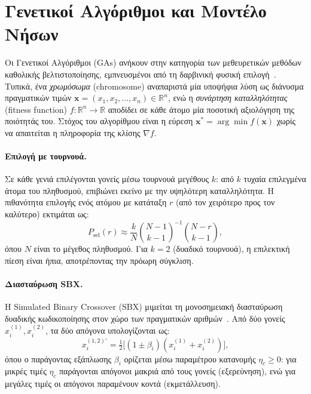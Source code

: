 \section{Γενετικοί Αλγόριθμοι και Μοντέλο Νήσων}
\label{sec:bg_ga_islands}

Οι Γενετικοί Αλγόριθμοι (GAs) ανήκουν στην κατηγορία των μεθευρετικών μεθόδων καθολικής βελτιστοποίησης, εμπνευσμένοι από τη δαρβινική φυσική επιλογή~\cite{goldberg1989genetic}. Τυπικά, ένα \textit{χρωμόσωμα} (chromosome) αναπαριστά μία υποψήφια λύση ως διάνυσμα πραγματικών τιμών $\bm{x} = (x_1, x_2, \ldots, x_n) \in \mathbb{R}^n$, ενώ η \textit{συνάρτηση καταλληλότητας} (fitness function) $f : \mathbb{R}^n \to \mathbb{R}$ αποδίδει σε κάθε άτομο μία ποσοτική αξιολόγηση της ποιότητάς του. Στόχος του αλγορίθμου είναι η εύρεση $\bm{x}^* = \arg\min f(\bm{x})$ χωρίς να απαιτείται η πληροφορία της κλίσης $\nabla f$.

\paragraph{Επιλογή με τουρνουά.}
Σε κάθε γενιά επιλέγονται γονείς μέσω τουρνουά μεγέθους $k$: από $k$ τυχαία επιλεγμένα άτομα του πληθυσμού, επιβιώνει εκείνο με την υψηλότερη καταλληλότητα. Η πιθανότητα επιλογής ενός ατόμου με κατάταξη $r$ (από τον χειρότερο προς τον καλύτερο) εκτιμάται ως:
\begin{equation}
    P_{\text{sel}}(r) \approx \frac{k}{N}\binom{N-1}{k-1}^{-1}\binom{N-r}{k-1},
\end{equation}
όπου $N$ είναι το μέγεθος πληθυσμού. Για $k=2$ (δυαδικό τουρνουά), η επιλεκτική πίεση είναι ήπια, αποτρέποντας την πρόωρη σύγκλιση.

\paragraph{Διασταύρωση SBX.}
Η Simulated Binary Crossover (SBX) μιμείται τη μονοσημειακή διασταύρωση δυαδικής κωδικοποίησης στον χώρο των πραγματικών αριθμών~\cite{goldberg1989genetic}. Από δύο γονείς $x_i^{(1)}, x_i^{(2)}$, τα δύο απόγονα υπολογίζονται ως:
\begin{equation}
    x_i^{(1,2)'} = \tfrac{1}{2}\bigl[(1 \pm \beta_i)(x_i^{(1)} + x_i^{(2)})\bigr],
\end{equation}
όπου ο παράγοντας εξάπλωσης $\beta_i$ ορίζεται μέσω παραμέτρου κατανομής $\eta_c \geq 0$: για μικρές τιμές $\eta_c$ παράγονται απόγονοι μακριά από τους γονείς (εξερεύνηση), ενώ για μεγάλες τιμές οι απόγονοι παραμένουν κοντά (εκμετάλλευση).


